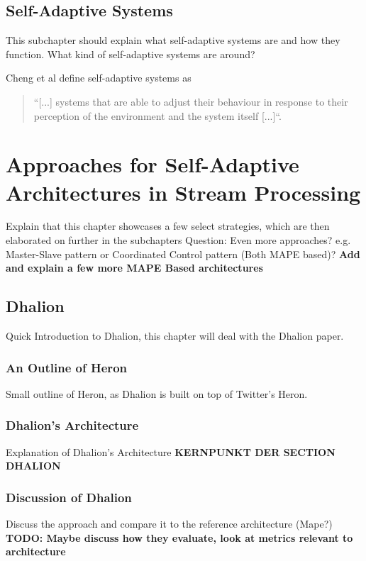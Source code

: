     
    \section{Self-Adaptive Systems}
    This subchapter should explain what self-adaptive systems are and how they function.
    What kind of self-adaptive systems are around?

    Cheng et al define self-adaptive systems as
    \begin{quotation}
        ``[...] systems that are able to adjust their behaviour in response to their perception of the environment and the
        system itself [...]``\cite[p.1]{Cheng:2009:SES:1573856.1573858}.
    \end{quotation}

    





\chapter{Approaches for Self-Adaptive Architectures in Stream Processing}
Explain that this chapter showcases a few select strategies, which are then elaborated on further in the subchapters
Question: Even more approaches? e.g. Master-Slave pattern or Coordinated Control pattern (Both MAPE based)?
\textbf{Add and explain a few more MAPE Based architectures}

    \section{Dhalion}
    Quick Introduction to Dhalion, this chapter will deal with the Dhalion paper.

        \subsection{An Outline of Heron}
        Small outline of Heron, as Dhalion is built on top of Twitter's Heron.

        \subsection{Dhalion's Architecture}
        Explanation of Dhalion's Architecture \textbf{KERNPUNKT DER SECTION DHALION}

        \subsection{Discussion of Dhalion}
        Discuss the approach and compare it to the reference architecture (Mape?)
        \textbf{TODO: Maybe discuss how they evaluate, look at metrics relevant to architecture}

